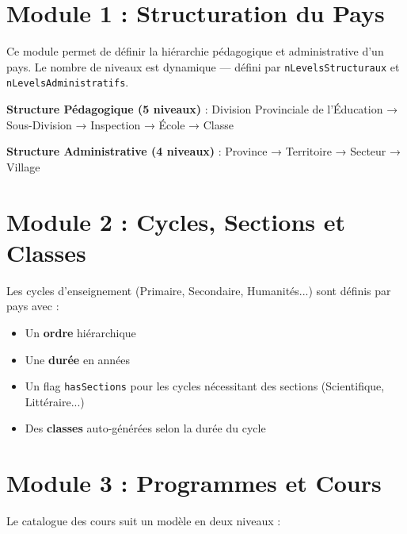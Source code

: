\documentclass[12pt,a4paper,oneside]{report}
\begin{document}
\section{Module 1 : Structuration du Pays}

Ce module permet de définir la hiérarchie pédagogique et administrative d'un pays. Le nombre de niveaux est dynamique — défini par \texttt{nLevelsStructuraux} et \texttt{nLevelsAdministratifs}.

\begin{successbox}
\textbf{Structure Pédagogique (5 niveaux)} : Division Provinciale de l'Éducation → Sous-Division → Inspection → École → Classe

\textbf{Structure Administrative (4 niveaux)} : Province → Territoire → Secteur → Village
\end{successbox}

\section{Module 2 : Cycles, Sections et Classes}

Les cycles d'enseignement (Primaire, Secondaire, Humanités...) sont définis par pays avec :
\begin{itemize}
  \item Un \textbf{ordre} hiérarchique
  \item Une \textbf{durée} en années
  \item Un flag \texttt{hasSections} pour les cycles nécessitant des sections (Scientifique, Littéraire...)
  \item Des \textbf{classes} auto-générées selon la durée du cycle
\end{itemize}

\section{Module 3 : Programmes et Cours}

Le catalogue des cours suit un modèle en deux niveaux :

\begin{center}
\end{center}
\end{document}

